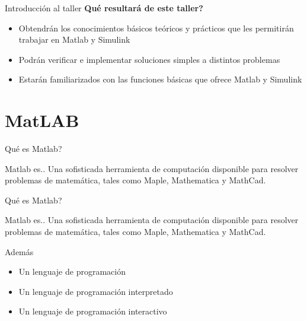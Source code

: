 \documentclass{bredelebeamer}
\begin{document}
\begin{frame}{Introducción al taller}
\textbf{Qué resultará de este taller?}\\
\begin{itemize}
\item Obtendrán los conocimientos básicos teóricos y prácticos que les permitirán trabajar en Matlab y Simulink
\item Podrán verificar e implementar soluciones simples a distintos problemas
\item Estarán familiarizados con las funciones básicas que ofrece Matlab y Simulink
\end{itemize}
\end{frame}




\section{MatLAB}

\begin{frame}{Qué es Matlab?}
\begin{block}{Matlab es..}
Una sofisticada herramienta de computación disponible para resolver problemas de matemática, tales como Maple, Mathematica y MathCad.
\end{block}
\end{frame}

\begin{frame}{Qué es Matlab?}
\begin{block}{Matlab es..}
Una sofisticada herramienta de computación disponible para resolver problemas de matemática, tales como Maple, Mathematica y MathCad.
\end{block}
\Large Además \normalsize
\begin{itemize}
\item Un lenguaje de programación
\item Un lenguaje de programación interpretado
\item Un lenguaje de programación interactivo
\end{itemize}
\end{frame}
\end{document}
